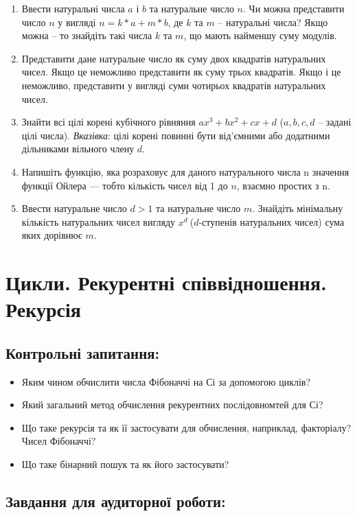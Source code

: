 \documentclass[a5paper,titlepage,openany,twoside,draft]{book_unv}%
\begin{document}
\begin{enumerate}
\def\labelenumi{\arabic{enumi})}
\setcounter{enumi}{26}
\item
  Ввести натуральні числа $a$ і $b$ та натуральне число $n$. Чи можна
  представити число $n$ у вигляді $n= k*a + m*b$, де $k$ та $m$ -- натуральні
  числа? Якщо можна -- то знайдіть такі числа $k$ та $m$, що мають найменшу
  суму модулів.
\item
  Представити дане натуральне число як суму двох квадратів натуральних
  чисел. Якщо це неможливо представити як суму трьох квадратів. Якщо і
  це неможливо, представити у вигляді суми чотирьох квадратів
  натуральних чисел.
\item
  Знайти всі цілі корені кубічного рівняння $ax^3 + bx^2 + cx + d$ ($a,b,c,d$ 
-- задані цілі числа). \emph{Вказівка}: цілі корені повинні бути від'ємними
 або додатними дільниками вільного члену $d$.
\item
  Напишіть функцію, яка розраховує для даного натурального числа n
  значення функції Ойлера --- тобто кількість чисел від 1 до $n$, взаємно простих з
  n.
\item
  Ввести натуральне число \(d > 1\) та натуральне число $m$. Знайдіть
  мінімальну кількість натуральних чисел вигляду \(x^{d}\ \)(\(d\)-ступенів
  натуральних чисел) сума яких дорівнює $m$.
\end{enumerate}


\chapter{Цикли. Рекурентні співвідношення. Рекурсія }
%

\section{Контрольні запитання:}
\begin{itemize}
\item
  Яким чином обчислити числа Фібоначчі на Сі за допомогою циклів?
\item
  Який загальний метод обчислення рекурентних послідовномтей для Сі?
\item
  Що таке рекурсія та як її застосувати для обчислення, наприклад,
  факторіалу? Чисел Фібоначчі?
\item
  Що таке бінарний пошук та як його застосувати?
\end{itemize}

\section{Завдання для аудиторної роботи:}
\end{document}
